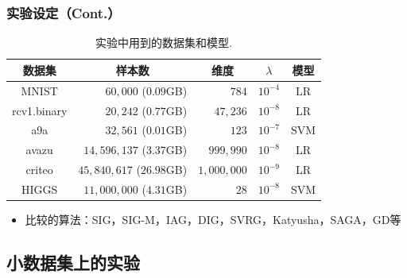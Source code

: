   \frame
  {
    \frametitle{实验设定（Cont.）}
    \footnotesize
    \begin{table}[H]
      \centering
      \caption{实验中用到的数据集和模型{\color{white}.}} \label{tb:dataset}
      \begin{tabular}{|c|r|r|c|c|}
        \hline
        数据集          & \multicolumn{1}{c|}{样本数}       & \multicolumn{1}{c|}{维度} & $\lambda$   & 模型 \\ \hline
        MNIST          & $60,000$ ($0.09$GB)              & $784$                  & $10^{-4}$     & LR \\
        rcv1.binary    & $20,242$ ($0.77$GB)              & $47,236$               & $10^{-8}$     & LR  \\
        a9a            & $32,561$ ($0.01$GB)              & $123$                  & $10^{-7}$     & SVM  \\
        avazu          & $14,596,137$ ($3.37$GB)          & $999,990$              & $10^{-8}$     & LR  \\
        criteo         & $45,840,617$ ($26.98$GB)         & $1,000,000$            & $10^{-9}$     & LR  \\
        HIGGS          & $11,000,000$ ($4.31$GB)          & $28$                   & $10^{-8}$     & SVM  \\
        \hline
      \end{tabular}
    \end{table}

\pause

    \begin{itemize}
        \item 比较的算法：SIG，SIG-M，IAG，DIG，SVRG，Katyusha，SAGA，GD等
    \end{itemize}
  }

  \subsection{小数据集上的实验}


